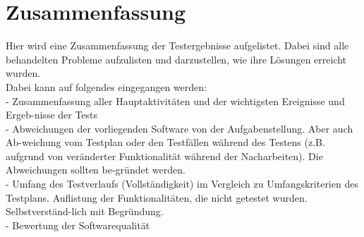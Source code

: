 

\chapter{Zusammenfassung}
Hier wird eine Zusammenfassung der Testergebnisse aufgelistet. Dabei sind alle
behandelten Probleme aufzulisten und darzustellen, wie ihre L\"osungen erreicht
wurden.\\
Dabei kann auf folgendes eingegangen werden:\\
-  Zusammenfassung aller Hauptaktivit\"aten und der wichtigsten Ereignisse und
   Ergeb-nisse der Tests \\
-  Abweichungen der vorliegenden Software von der Aufgabenstellung. Aber auch
   Ab-weichung vom Testplan oder den Testf\"allen w\"ahrend des Testens (z.B.
   aufgrund von ver\"anderter Funktionalit\"at w\"ahrend der Nacharbeiten). Die
   Abweichungen sollten be-gr\"undet werden.\\
-  Umfang des Testverlaufs (Vollst\"andigkeit) im Vergleich zu Umfangskriterien
   des Testplans. Auflistung der Funktionalit\"aten, die nicht getestet wurden.
   Selbstverst\"and-lich mit Begr\"undung.\\
-  Bewertung der Softwarequalit\"at
